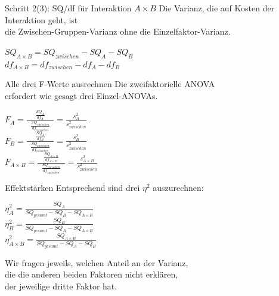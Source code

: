 \begin{frame}
  {Schritt 2(3): SQ\slash df für Interaktion $A\times B$}
  Die Varianz, die auf Kosten der Interaktion geht, ist\\
  \alert{die Zwischen-Gruppen-Varianz ohne die Einzelfaktor-Varianz}.\\

  \vspace{0.5cm}
  \begin{center}
    $SQ_{A\times B}=SQ_{zwischen}-SQ_A-SQ_B$\\
    $df_{A\times B}=df_{zwischen}-df_A-df_B$
  \end{center}
\end{frame}

\begin{frame}
  {Alle drei F-Werte ausrechnen}
  Die \alert{zwei}faktorielle ANOVA\\
  erfordert wie gesagt \alert{drei} Einzel-ANOVAs.\\

  \begin{center}
    $F_A=\frac{\frac{SQ_A}{df_A}}{\ \ \ \frac{SQ_{zwischen}}{df_{zwischen}}\ \ \ }=\frac{s^2_A}{s^2_{zwischen}}$\\[3ex]
    $F_B=\frac{\frac{SQ_A}{df_B}}{\ \ \ \frac{SQ_{zwischen}}{df_{zwischen}}\ \ \ }=\frac{s^2_B}{s^2_{zwischen}}$\\[3ex]
    $F_{A\times B}=\frac{\frac{SQ_{A\times B}}{df_{A\times B}}}{\ \ \ \frac{SQ_{zwischen}}{df_{zwischen}}\ \ \ }=\frac{s^2_{A\times B}}{s^2_{zwischen}}$\\
  \end{center}
\end{frame}

\begin{frame}
  {Effektstärken}
  Entsprechend sind \alert{drei} $\eta^2$ auszurechnen:\\

  \vspace{0.5cm}
  \begin{center}
    $\eta^2_A=\frac{SQ_A}{SQ_{gesamt} - SQ_B - SQ_{A\times B}}$ \\[3ex]
    $\eta^2_B=\frac{SQ_B}{SQ_{gesamt} - SQ_A - SQ_{A\times B}}$ \\[3ex]
    $\eta^2_{A\times B}=\frac{SQ_{A\times B}}{SQ_{gesamt} - SQ_A - SQ_B}$ \\
  \end{center}

  Wir fragen jeweils, welchen Anteil an der Varianz,\\
  die die anderen beiden Faktoren \alert{nicht} erklären,\\
  der jeweilige dritte Faktor hat.
\end{frame}

